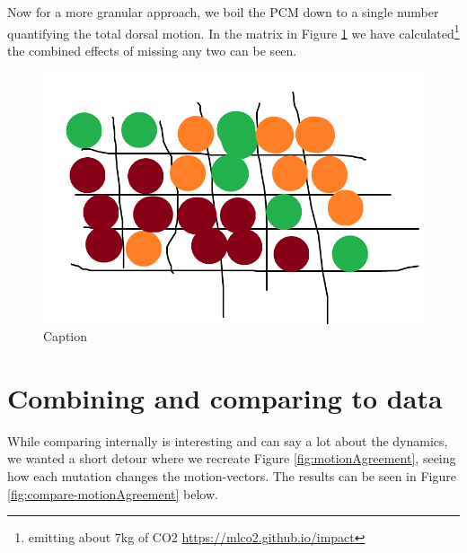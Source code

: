 Now for a more granular approach, we boil the PCM down to a single number quantifying the total dorsal motion. In the matrix in Figure \ref{fig:PCM-matrix} we have calculated\footnote{emitting about 7kg of CO2 \url{https://mlco2.github.io/impact} } the combined effects of missing any two can be seen. 

\begin{figure}[H]
    \centering
    \includegraphics[width=1.\linewidth]{chapters/Results/figures/placeholder_domain_matrix.png}
    \caption{Caption}
    \label{fig:PCM-matrix}
\end{figure}


\section{Combining and comparing to data}
While comparing internally is interesting and can say a lot about the dynamics, we wanted a short detour where we recreate Figure \ref{fig:motionAgreement}, seeing how each mutation changes the motion-vectors. The results can be seen in Figure \ref{fig:compare-motionAgreement} below.


